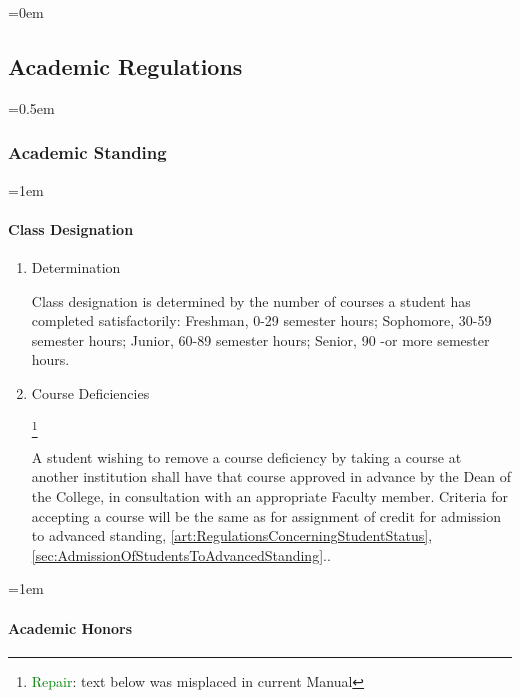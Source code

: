 \documentclass{manual}
\newcommand{\oldbreak}[1]{}
\let\oldsubsection\subsection
\renewcommand\subsection{\leftskip=0em\oldsubsection}
\let\oldsubsubsection\subsubsection
\renewcommand\subsubsection{\leftskip=0.5em\oldsubsubsection}
\let\oldparagraph\paragraph
\renewcommand\paragraph{\leftskip=1em\oldparagraph}
\newcommand{\editRemark}[3]{\textcolor{green}{#2}\footnote{\textcolor{green}{#1}: #3}}
\newcommand{\itemLevelA}{\alph*.}
\newcommand{\itemRefA}{\alph*}
\begin{document}
\oldbreak{VI-2}

\subsection{Academic Regulations}\label{sec:AcademicRegulations}
\subsubsection{Academic Standing}\label{sub:AcademicStanding}

\paragraph{Class Designation }

\begin{enumerate}[label=\itemLevelA,ref=\itemRefA]
\item Determination

Class designation is determined by the number of courses a student has completed satisfactorily: Freshman, 0-29 semester hours; Sophomore, 30-59 semester hours; Junior, 60-89 semester hours; Senior, 90 -or more semester hours.

\item Course Deficiencies

\editRemark{Repair}{}{text below was misplaced in current Manual}

A student wishing to remove a course deficiency by taking a course at another institution shall have that course approved in advance by the Dean of the College, in consultation with an appropriate Faculty member. Criteria for accepting a course will be the same as for assignment of credit for admission to advanced standing, \cref{art:RegulationsConcerningStudentStatus}, \cref{sec:AdmissionOfStudentsToAdvancedStanding}..
\end{enumerate}
\paragraph{Academic Honors}
\end{document}
